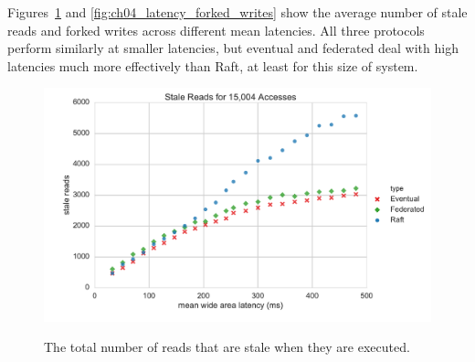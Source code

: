 Figures~\ref{fig:ch04_latency_stale_reads} and \ref{fig:ch04_latency_forked_writes} show the average number of stale reads and forked writes across different mean latencies.
All three protocols perform similarly at smaller latencies, but eventual and federated deal with high latencies much more effectively than Raft, at least
for this size of system.

\begin{figure}
    \begin{center}
        \includegraphics[width=5in]{figures/ch04_latency_stale_reads.pdf}
    \end{center}
    \renewcommand{\baselinestretch}{1}
    \small\normalsize

    \begin{quote}
        \caption[Latency Simulation Stale Reads]{The total number of reads that are stale when they are executed.}
        \label{fig:ch04_latency_stale_reads}
    \end{quote}
\end{figure}
\renewcommand{\baselinestretch}{2}
\small\normalsize

